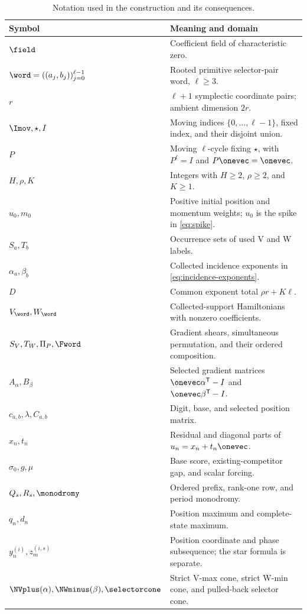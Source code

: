 \documentclass[11pt,letterpaper]{article}
\theoremstyle{definition}
\theoremstyle{remark}
\numberwithin{equation}{section}
\begin{document}
\begin{table}[t]
\centering
\caption{Notation used in the construction and its consequences.}
\label{tab:notation}
\begin{tabularx}{\textwidth}{@{}p{}X@{}}
\toprule
Symbol & Meaning and domain \\
\midrule
\(\field\) & Coefficient field of characteristic zero. \\
\(\word=((a_j,b_j))_{j=0}^{\ell-1}\) & Rooted primitive selector-pair word, \(\ell\geq3\). \\
\(r\) & \(\ell+1\) symplectic coordinate pairs; ambient dimension \(2r\). \\
\(\Imov,\star,I\) & Moving indices \(\{0,\ldots,\ell-1\}\), fixed index, and their disjoint union. \\
\(P\) & Moving \(\ell\)-cycle fixing \(\star\), with \(P^\ell=I\) and \(P\onevec=\onevec\). \\
\(H,\rho,K\) & Integers with \(H\geq2\), \(\rho\geq2\), and \(K\geq1\). \\
\(u_0,m_0\) & Positive initial position and momentum weights; \(u_0\) is the spike in \eqref{eq:spike}. \\
\(S_a,T_b\) & Occurrence sets of used V and W labels. \\
\(\alpha_a,\beta_b\) & Collected incidence exponents in \eqref{eq:incidence-exponents}. \\
\(D\) & Common exponent total \(\rho r+K\ell\). \\
\(V_{\word},W_{\word}\) & Collected-support Hamiltonians with nonzero coefficients. \\
\(S_V,T_W,\Pi_P,\Fword\) & Gradient shears, simultaneous permutation, and their ordered composition. \\
\(A_\alpha,B_\beta\) & Selected gradient matrices \(\onevec\alpha^{\mathsf T}-I\) and \(\onevec\beta^{\mathsf T}-I\). \\
\(c_{a,b},\lambda,C_{a,b}\) & Digit, base, and selected position matrix. \\
\(x_n,t_n\) & Residual and diagonal parts of \(u_n=x_n+t_n\onevec\). \\
\(\sigma_0,g,\mu\) & Base score, existing-competitor gap, and scalar forcing. \\
\(Q_s,R_s,\monodromy\) & Ordered prefix, rank-one row, and period monodromy. \\
\(q_n,d_n\) & Position maximum and complete-state maximum. \\
\(y_n^{(i)},z_m^{(i,s)}\) & Position coordinate and phase subsequence; the star formula is separate. \\
\(\NVplus(\alpha),\NWminus(\beta),\selectorcone\) & Strict V-max cone, strict W-min cone, and pulled-back selector cone. \\
\bottomrule
\end{tabularx}
\end{table}
\end{document}
